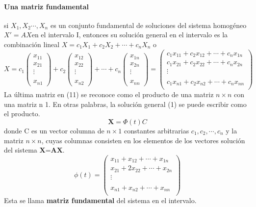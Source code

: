 \documentclass[11.5pt]{article}
\begin{document}
\paragraph{Una matriz fundamental}
si $ X_1,X_2\cdots,X_n $ es un conjunto fundamental de soluciones del sistema homogéneo  $X'=AX$en el intervalo I, entonces su solución general en el intervalo es la combinación lineal $X=c_1X_1+c_2X_2+\cdots+c_nX_n$ o
\begin{equation}
\left.
X=c_1
\begin{pmatrix}
x_{11}\\
x_{21}\\
\vdots\\\\
x_{n1}
\end{pmatrix}
+c_2
\begin{pmatrix}
x_{12}\\
x_{22}\\
\vdots\\\\
x_{n2}
\end{pmatrix}
+
\cdots+c_n
\begin{pmatrix}
x_{1n}\\
x_{2n}\\
\vdots\\\\
x_{nn}
\end{pmatrix}
=
\begin{pmatrix}
c_1x_{11}+c_2x_{12}+\cdots+c_nx_{1n}\\
c_1x_{21}+c_2x_{22}+\cdots+c_nx_{2n}\\
\vdots\\\\
c_1x_{n1}+c_2x_{n2}+\cdots+c_nx_{nn}\\
\end{pmatrix}
\right.
\end{equation}
La última matriz en (11) se reconoce como el producto de una matriz $n \times n$ con una matriz
n  1. En otras palabras, la solución general (1) se puede escribir como el producto.\\
$$\textbf{X}=\Phi(t)C$$
donde C es un vector columna de $n\times1$ constantes arbitrarias $c_1,c_2, \cdots, c_n$ y la matriz
$ n \times n $, cuyas columnas consisten en los elementos de los vectores solución del sistema $\textbf{X=AX}$.
\begin{equation}
\phi(t)=\begin{pmatrix}
x_{11}+x_{12}+\cdots+x_{1n}\\
x_{21}+2x_{22}+\cdots+x_{2n}\\
\vdots\\\\
x_{n1}+x_{n2}+\cdots+x_{nn}\\
\end{pmatrix}
\end{equation}
Esta se llama \textbf{matriz fundamental} del sistema en el intervalo.
\end{document}
